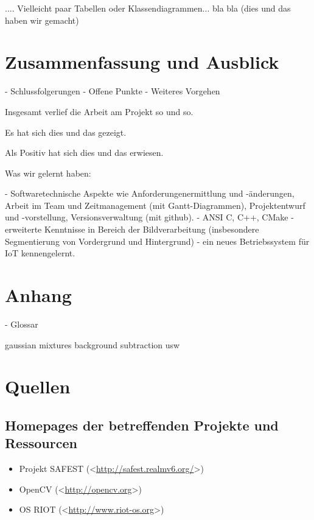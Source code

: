 \documentclass[10pt,a4paper]{article}
\begin{document}
.... Vielleicht paar Tabellen oder Klassendiagrammen...  bla bla
(dies und das haben wir gemacht)

\newpage
\section{Zusammenfassung und Ausblick}

- Schlussfolgerungen
- Offene Punkte
- Weiteres Vorgehen

Insgesamt verlief die Arbeit am Projekt so und so.

Es hat sich dies und das gezeigt.

Als Positiv hat sich dies und das erwiesen.

Was wir gelernt haben:

- Softwaretechnische Aspekte wie Anforderungenermittlung und -änderungen, Arbeit im Team und Zeitmanagement (mit Gantt-Diagrammen), Projektentwurf und -vorstellung, Versionsverwaltung (mit github).
- ANSI C, C++, CMake
- erweiterte Kenntnisse in Bereich der Bildverarbeitung (insbesondere Segmentierung von Vordergrund und Hintergrund)
- ein neues Betriebssystem für IoT kennengelernt.

\newpage
\section{Anhang}

- Glossar

gaussian mixtures
background subtraction usw


\newpage
\section{Quellen}

\subsection*{Homepages der betreffenden Projekte und Ressourcen}
\begin{itemize}
\item Projekt SAFEST (\textless\href{http://safest.realmv6.org/}{http://safest.realmv6.org/}\textgreater)
\item OpenCV (\textless\href{http://opencv.org}{http://opencv.org}\textgreater)
\item OS RIOT (\textless\href{http://www.riot-os.org}{http://www.riot-os.org}\textgreater)
\end{itemize}
\end{document}
